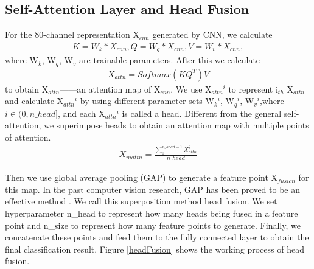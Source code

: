 \documentclass[10pt, conference, compsocconf]{IEEEtran}
\begin{document}
\subsection{Self-Attention Layer and Head Fusion}
For the 80-channel representation X$_{cnn}$ generated by CNN, we calculate
\begin{equation}
\begin{split}
\displaystyle
K=W_k*X_{cnn},
Q=W_q*X_{cnn},
V=W_v*X_{cnn},
\end{split}
\end{equation}
where W$_k$, W$_q$, W$_v$ are trainable parameters.
After this we calculate
\begin{equation}
\begin{split}
\displaystyle
X_{attn}=Softmax(KQ^T)V
\end{split}
\end{equation}
to obtain X$_{attn}$——an attention map of X$_{cnn}$. We use X$_{attn}$$^i$ to represent i$_{th}$ X$_{attn}$ and calculate X$_{attn}$$^i$ by using different parameter sets W$_k$$^i$, W$_q$$^i$, W$_v$$^i$,where $i \in (0,n\_head]$, and each X$_{attn}$$^i$ is called a head. Different from the general self-attention, we superimpose heads to obtain an attention map with multiple points of attention.
\begin{equation}
\begin{split}
\displaystyle
X_{mattn}=\frac{\sum_{0}^{n\_head-1}X_{attn}^i}{n\_head}
\end{split}
\end{equation}

Then we use global average pooling (GAP) to generate a feature point X$_{fusion}$ for this map. In the past computer vision research, GAP has been proved to be an effective method \cite{he2016deep}. We call this superposition method head fusion. We set hyperparameter n\_head to represent how many heads being fused in a feature point and n\_size to represent how many feature points to generate. Finally, we concatenate these points and feed them to the fully connected layer to obtain the final classification result.
Figure \ref{headFusion} shows the working process of head fusion.
\end{document}
